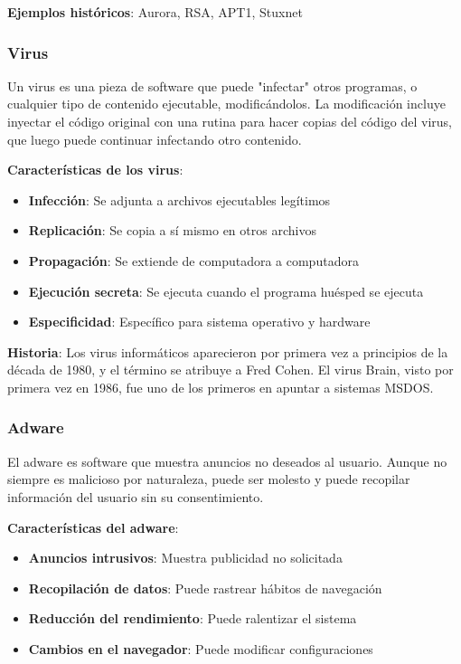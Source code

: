 \textbf{Ejemplos históricos}: Aurora, RSA, APT1, Stuxnet

\subsubsection{Virus}

Un virus es una pieza de software que puede "infectar" otros programas, o cualquier tipo de contenido ejecutable, modificándolos. La modificación incluye inyectar el código original con una rutina para hacer copias del código del virus, que luego puede continuar infectando otro contenido.

\textbf{Características de los virus}:
\begin{itemize}
    \item \textbf{Infección}: Se adjunta a archivos ejecutables legítimos
    \item \textbf{Replicación}: Se copia a sí mismo en otros archivos
    \item \textbf{Propagación}: Se extiende de computadora a computadora
    \item \textbf{Ejecución secreta}: Se ejecuta cuando el programa huésped se ejecuta
    \item \textbf{Especificidad}: Específico para sistema operativo y hardware
\end{itemize}

\textbf{Historia}: Los virus informáticos aparecieron por primera vez a principios de la década de 1980, y el término se atribuye a Fred Cohen. El virus Brain, visto por primera vez en 1986, fue uno de los primeros en apuntar a sistemas MSDOS.

\subsubsection{Adware}

El adware es software que muestra anuncios no deseados al usuario. Aunque no siempre es malicioso por naturaleza, puede ser molesto y puede recopilar información del usuario sin su consentimiento.

\textbf{Características del adware}:
\begin{itemize}
    \item \textbf{Anuncios intrusivos}: Muestra publicidad no solicitada
    \item \textbf{Recopilación de datos}: Puede rastrear hábitos de navegación
    \item \textbf{Reducción del rendimiento}: Puede ralentizar el sistema
    \item \textbf{Cambios en el navegador}: Puede modificar configuraciones
\end{itemize}

